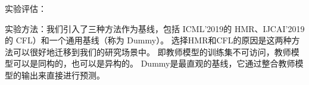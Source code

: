 \documentclass[fontset=macnew,UTF8]{article} %
\begin{document}
实验评估：

实验方法：我们引入了三种方法作为基线，包括 ICML’2019\cite{wu2019heterogeneous}的 HMR、IJCAI’2019\cite{luo2019knowledge}的 CFL）和一个通用基线（称为
Dummy）。 选择HMR和CFL的原因是这两种方法可以很好地迁移到我们的研究场景中。 即教师模型的训练集不可访问，教师模型可以是同构的，也可以是异构的。 Dummy是最直观的基线，它通过整合教师模型的输出来直接进行预测。

\begin{figure}[t]
\end{figure}
\end{document}
